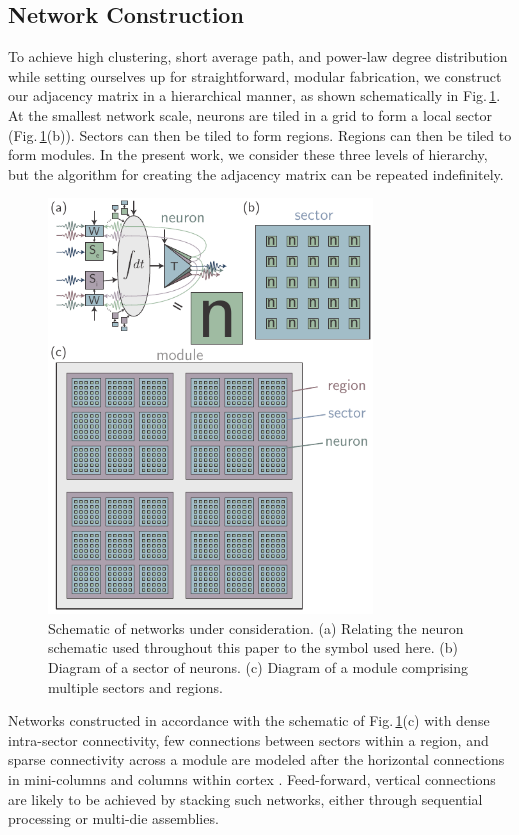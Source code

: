 \documentclass[aip,amsmath,amssymb,reprint,nofootinbib]{revtex4-1}
\begin{document}
\subsection{\label{sec:networkConstruction}Network Construction}
To achieve high clustering, short average path, and power-law degree distribution while setting ourselves up for straightforward, modular fabrication, we construct our adjacency matrix in a hierarchical manner, as shown schematically in Fig.\,\ref{fig:networks_schematic}. At the smallest network scale, neurons are tiled in a grid to form a local sector (Fig.\,\ref{fig:networks_schematic}(b)). Sectors can then be tiled to form regions. Regions can then be tiled to form modules. In the present work, we consider these three levels of hierarchy, but the algorithm for creating the adjacency matrix can be repeated indefinitely. 
\begin{figure}[t!]
	\centerline{\includegraphics[width=8.6cm]{_networks_schematic_small.pdf}}
	\caption{\label{fig:networks_schematic}Schematic of networks under consideration. (a) Relating the neuron schematic used throughout this paper to the symbol used here. (b) Diagram of a sector of neurons. (c) Diagram of a module comprising multiple sectors and regions.}
\end{figure}
Networks constructed in accordance with the schematic of Fig.\,\ref{fig:networks_schematic}(c) with dense intra-sector connectivity, few connections between sectors within a region, and sparse connectivity across a module are modeled after the horizontal connections in mini-columns and columns within cortex \cite{mo1997,spto2000,brto2006,haah2017}. Feed-forward, vertical connections are likely to be achieved by stacking such networks, either through sequential processing or multi-die assemblies.
\end{document}
